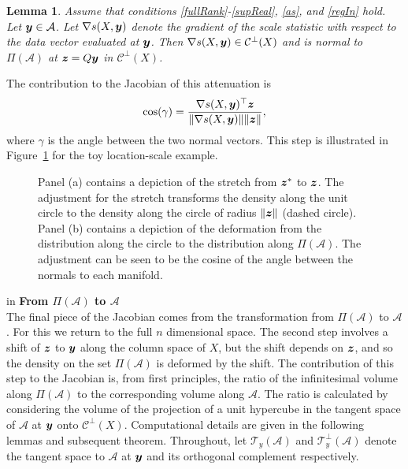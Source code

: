 \documentclass[12pt]{article}
\newcommand{\by}{\mbox{\boldmath $y$}}
\newcommand{\bz}{\mbox{\boldmath $z$}}
\newcommand{\mc}{\mathcal}
\newtheorem{lemma}[theorem]{\bf Lemma}
\begin{document}
\begin{lemma}
\label{gradSTheoremReg}
Assume that conditions \ref{fullRank}-\ref{supReal}, \ref{as}, and \ref{regIn} hold.  
Let $\by\in \mathcal{A}$. Let 
$\nabla s(X,\by)$ denote the
gradient of the scale statistic with respect to the data vector evaluated at
$\by$.  Then $\nabla s(X,\by)\in \mc{C}^\perp(X)$ and is 
normal to $\Pi(\mathcal{A})$ at $\bz=Q\by$  in $\mc{C}^\perp(X)$.
\end{lemma}

The contribution to the  Jacobian of this attenuation is 
\begin{equation}
\label{cosine}
\cos(\gamma)=\frac{\nabla s(X,\by)^\top \bz}{\|\nabla
s(X,\by)\| \|\bz\|},
\end{equation}
where $\gamma$ is the angle between the two normal vectors.
This step is illustrated in Figure~\ref{fig:stretchDeform} for the toy
location-scale example.  

\begin{figure}[!ht]
\centering
{}\quad
{}
\caption{Panel (a) contains a depiction of the stretch from $\bz^{*}$
  to $\bz$. The adjustment for the stretch transforms the density
  along the unit circle to the density along the circle of radius
  $\|\bz\|$ (dashed circle).  Panel (b) contains a depiction of the
  deformation from the distribution along the circle to the
  distribution along $\Pi(\mathcal{A})$. The adjustment can be seen to
  be the cosine of the angle between the normals to each manifold.}
\label{fig:stretchDeform}
\end{figure}

 in
\noindent
{\bf From $\Pi(\mathcal{A})$ to $\mathcal{A}$} \\
The final piece of the Jacobian comes from the transformation from
$\Pi(\mathcal{A})$ to $\mathcal{A}$.  For this we return to the full
$n$ dimensional space.  The second step involves a shift of
$\bz$ to $\by$ along the column space of $X$, but the shift depends on 
$\bz$, and so the density on the set 
$\Pi(\mathcal{A})$ is deformed by the shift. The
contribution of this step to the Jacobian is, from first principles,
the ratio of the infinitesimal volume along $\Pi(\mathcal{A})$ to the
corresponding volume along $\mathcal{A}$. 
The ratio is calculated by considering the volume of the
projection of a unit hypercube in the tangent space of $\mathcal{A}$
at $\by$ onto $\mc{C}^\perp(X)$.
Computational details are
given in the following lemmas and subsequent theorem. Throughout, let
$\mc T_{y}(\mc A)$ and $\mc T_{y}^{\perp}(\mc A)$ denote the tangent
space to $\mc A$ at $\by$ and its orthogonal complement respectively. 
\end{document}
